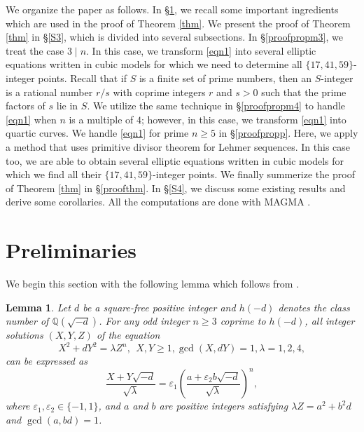 \documentclass[12pt, 14paper,reqno]{amsart}
\theoremstyle{plain}
\newtheorem{lem}{Lemma}[section]
\theoremstyle{proof}
\numberwithin{equation}{section}
\begin{document}
We organize the paper as follows. In \S\ref{S2}, we recall some important ingredients which are used in the proof of Theorem \ref{thm}. We present the proof of Theorem \ref{thm} in \S\ref{S3}, which is divided into several subsections. In \S\ref{proofpropm3}, we treat the case $3\mid n$. In this case, we transform \eqref{eqn1} into several elliptic equations written in cubic models for which we need to determine all $\{17,41,59\}$-integer points. Recall that if $S$ is a finite set of prime numbers, then an $S$-integer is  a rational number $r/s$ with coprime integers $r$ and $s>0$ such that the prime factors of $s$ lie in $S$. We utilize the same technique in \S\ref{proofpropm4} to handle \eqref{eqn1} when $n$ is a multiple of $4$; however, in this case, we transform \eqref{eqn1} into quartic curves. We handle \eqref{eqn1} for prime $n \geq  5$ in \S\ref{proofpropp}. Here, we apply a method that uses primitive divisor theorem for Lehmer sequences. In this case too, we are able to obtain several elliptic equations written in cubic models for which we find all their $\{17, 41, 59\}$-integer points. We finally summerize the proof of Theorem \ref{thm} in \S\ref{proofthm}. In \S\ref{S4}, we discuss some existing results   and derive some corollaries. All the computations are done with MAGMA \cite{BCP97}. 

\section{Preliminaries}\label{S2}
We begin this section with the following lemma which follows from \cite[Corollary 3.1]{YU05}.

\begin{lem}\label{lemYU}
Let $d$ be a square-free positive integer and $h(-d)$ denotes the class number of $\mathbb{Q}(\sqrt{-d})$. For any odd integer $n\geq 3$ coprime to $h(-d)$, all integer solutions $(X,Y,Z)$ of the equation 
\begin{equation*}\label{eqYU}
X^2+dY^2=\lambda Z^n,~~ X,Y\geq 1, \gcd(X, dY)=1, \lambda=1,2,4,
\end{equation*} 
can be expressed as 
$$\frac{X+Y\sqrt{-d}}{\sqrt{\lambda}}=\varepsilon_1\left(\frac{a+\varepsilon_2 b\sqrt{-d}}{\sqrt{\lambda}}\right)^n,$$
where $\varepsilon_1,\varepsilon_2\in\{-1, 1\}$, and $a$ and $b$ are positive integers satisfying $\lambda Z=a^2+b^2d$ and $\gcd(a, bd)=1$.
\end{lem}
\end{document}
